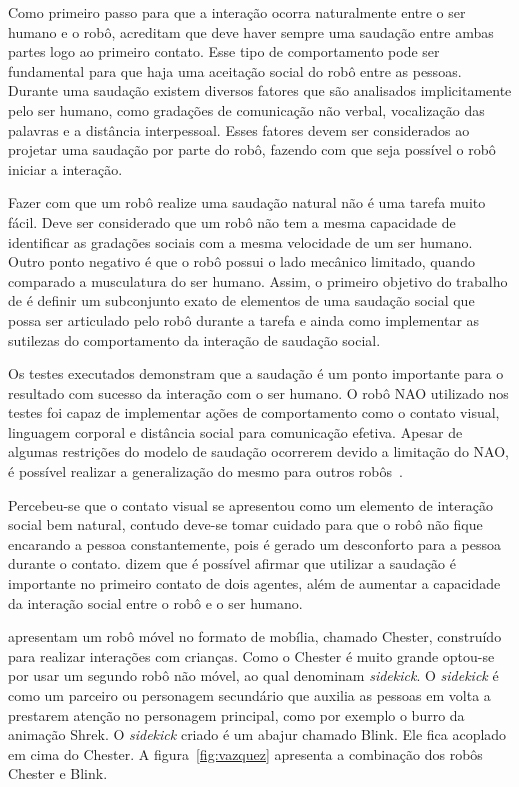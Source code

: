 Como primeiro passo para que a interação ocorra naturalmente entre o ser humano e o robô, \textcite{heenan:2014} acreditam que deve haver sempre uma saudação entre ambas partes logo ao primeiro contato. Esse tipo de comportamento pode ser fundamental para que haja uma aceitação social do robô entre as pessoas. Durante uma saudação existem diversos fatores que são analisados implicitamente pelo ser humano, como gradações de comunicação não verbal, vocalização das palavras e a distância interpessoal. Esses fatores devem ser considerados ao projetar uma saudação por parte do robô, fazendo com que seja possível o robô iniciar a interação.

Fazer com que um robô realize uma saudação natural não é uma tarefa muito fácil. Deve ser considerado que um robô não tem a mesma capacidade de identificar as gradações sociais com a mesma velocidade de um ser humano. Outro ponto negativo é que o robô possui o lado mecânico limitado, quando comparado a musculatura do ser humano. Assim, o primeiro objetivo do trabalho de \textcite{heenan:2014} é definir um subconjunto exato de elementos de uma saudação social que possa ser articulado pelo robô durante a tarefa e ainda como implementar as sutilezas do comportamento da interação de saudação social.

Os testes executados demonstram que a saudação é um ponto importante para o resultado com sucesso da interação com o ser humano. O robô NAO utilizado nos testes foi capaz de implementar ações de comportamento como o contato visual, linguagem corporal e distância social para comunicação efetiva. Apesar de algumas restrições do modelo de saudação ocorrerem devido a limitação do NAO, é possível realizar a generalização do mesmo para outros robôs~\cite{heenan:2014}.

Percebeu-se que o contato visual se apresentou como um elemento de interação social bem natural, contudo deve-se tomar cuidado para que o robô não fique encarando a pessoa constantemente, pois é gerado um desconforto para a pessoa durante o contato. \textcite{heenan:2014} dizem que é possível afirmar que utilizar a saudação é importante no primeiro contato de dois agentes, além de aumentar a capacidade da interação social entre o robô e o ser humano.

\textcite{vazquez:2014} apresentam um robô móvel no formato de mobília, chamado Chester, construído para realizar interações com crianças. Como o Chester é muito grande optou-se por usar um segundo robô não móvel, ao qual \textcite{vazquez:2014} denominam \emph{sidekick}. O \emph{sidekick} é como um parceiro ou personagem secundário que auxilia as pessoas em volta a prestarem atenção no personagem principal, como por exemplo o burro da animação Shrek. O \emph{sidekick} criado é um abajur chamado Blink. Ele fica acoplado em cima do Chester. A figura~\ref{fig:vazquez} apresenta a combinação dos robôs Chester e Blink.

